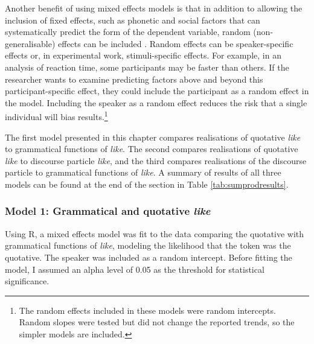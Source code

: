 Another benefit of using mixed effects models is that in addition to allowing the inclusion of fixed effects, such as phonetic and social factors that can systematically predict the form of the dependent variable, random (non-generalisable) effects can be included \cite[263-326]{baayen2008}.    Random effects can be speaker-specific effects or, in experimental work, stimuli-specific effects.  For example, in an analysis of reaction time, some participants may be faster than others.  If the researcher wants to examine predicting factors above and beyond this participant-specific effect, they could include the participant as a random effect in the model.   Including the speaker as a random effect reduces the risk that a single individual will bias results.\footnote{The random effects included in these models were random intercepts.  Random slopes were tested but did not change the reported trends, so the simpler models are included.} 

The first model presented in this chapter compares realisations of quotative \textit{like} to grammatical functions of \textit{like}.  The second compares realisations of quotative \textit{like} to discourse particle \textit{like}, and the third compares realisations of the discourse particle to grammatical functions of \textit{like}.  A summary of results of all three models can be found at the end of the section in Table \ref{tab:sumprodresults}. 

\subsubsection{Model 1: Grammatical and quotative \textit{like}}

Using R, a mixed effects model was fit to the data comparing the quotative with grammatical functions of \textit{like}, modeling the likelihood that the token was the quotative.  The speaker was included as a random intercept.    Before fitting the model, I assumed an alpha level of 0.05 as the threshold for statistical significance.  

